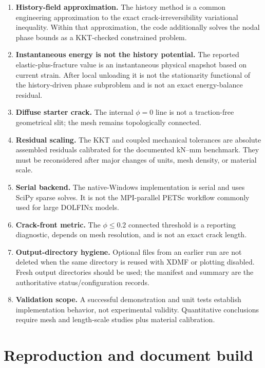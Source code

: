 \documentclass[11pt,a4paper]{article}
\begin{document}
\begin{enumerate}
  \item \textbf{History-field approximation.} The history method is a common
    engineering approximation to the exact crack-irreversibility variational
    inequality. Within that approximation, the code additionally solves the
    nodal phase bounds as a KKT-checked constrained problem.
  \item \textbf{Instantaneous energy is not the history potential.} The reported
    elastic-plus-fracture value is an instantaneous physical snapshot based on
    current strain. After local unloading it is not the stationarity functional
    of the history-driven phase subproblem and is not an exact energy-balance
    residual.
  \item \textbf{Diffuse starter crack.} The internal $\phi=0$ line is not a
    traction-free geometrical slit; the mesh remains topologically connected.
  \item \textbf{Residual scaling.} The KKT and coupled mechanical tolerances are
    absolute assembled residuals calibrated for the documented kN--mm benchmark.
    They must be reconsidered after major changes of units, mesh density, or
    material scale.
  \item \textbf{Serial backend.} The native-Windows implementation is serial and
    uses SciPy sparse solves. It is not the MPI-parallel PETSc workflow commonly
    used for large DOLFINx models.
  \item \textbf{Crack-front metric.} The $\phi\le0.2$ connected threshold is a
    reporting diagnostic, depends on mesh resolution, and is not an exact crack
    length.
  \item \textbf{Output-directory hygiene.} Optional files from an earlier run
    are not deleted when the same directory is reused with XDMF or plotting
    disabled. Fresh output directories should be used; the manifest and summary
    are the authoritative status/configuration records.
  \item \textbf{Validation scope.} A successful demonstration and unit tests
    establish implementation behavior, not experimental validity. Quantitative
    conclusions require mesh and length-scale studies plus material calibration.
\end{enumerate}

\section{Reproduction and document build}
\end{document}
